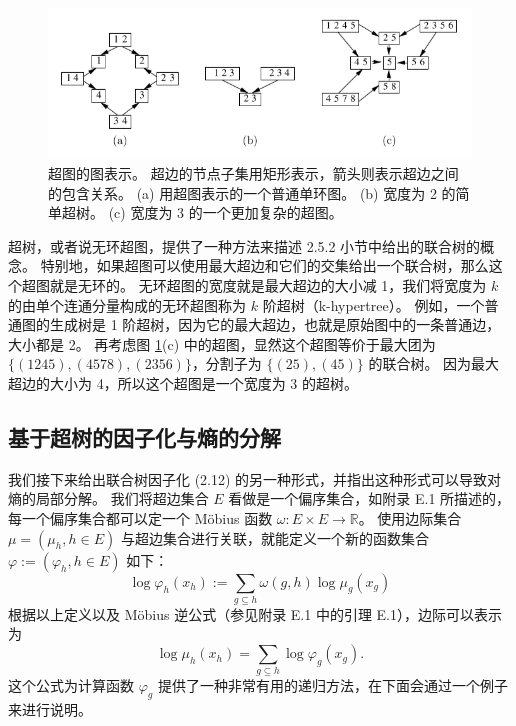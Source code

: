 \begin{figure}[htbp]
    \centering
    \includegraphics[width=.9\linewidth]{figure/4-4.PNG}
    \caption{
        超图的图表示。
        超边的节点子集用矩形表示，箭头则表示超边之间的包含关系。
        (a) 用超图表示的一个普通单环图。
        (b) 宽度为 2 的简单超树。
        (c) 宽度为 3 的一个更加复杂的超图。
    }\label{fig:4-4}
\end{figure}

超树，或者说无环超图，提供了一种方法来描述 2.5.2 小节中给出的联合树的概念。
特别地，如果超图可以使用最大超边和它们的交集给出一个联合树，那么这个超图就是无环的。
无环超图的宽度就是最大超边的大小减 1，我们将宽度为 $k$ 的由单个连通分量构成的无环超图称为 $k$ 阶超树（k-hypertree）。
例如，一个普通图的生成树是 1 阶超树，因为它的最大超边，也就是原始图中的一条普通边，大小都是 2。
再考虑图 \ref{fig:4-4}(c) 中的超图，显然这个超图等价于最大团为 $\{(1245), (4578), (2356)\}$，分割子为 $\{(25), (45)\}$ 的联合树。
因为最大超边的大小为 4，所以这个超图是一个宽度为 3 的超树。

\subsection{基于超树的因子化与熵的分解}

我们接下来给出联合树因子化 (2.12) 的另一种形式，并指出这种形式可以导致对熵的局部分解。
我们将超边集合 $E$ 看做是一个偏序集合，如附录 E.1 所描述的，每一个偏序集合都可以定一个 M\"obius 函数 $\omega: E \times E \rightarrow \mathbb{R}$。
使用边际集合 $\mu = (\mu_h, h \in E)$ 与超边集合进行关联，就能定义一个新的函数集合 $\varphi := (\varphi_h, h \in E)$ 如下：
\begin{equation}
    \log\varphi_h(x_h) := \sum_{g \subseteq h}\omega(g, h)\log\mu_g(x_g)
\end{equation}
根据以上定义以及 M\"obius 逆公式（参见附录 E.1 中的引理 E.1），边际可以表示为
\begin{equation}
    \log\mu_h(x_h) = \sum_{g \subseteq h}\log\varphi_g(x_g).
\end{equation}
这个公式为计算函数 $\varphi_g$ 提供了一种非常有用的递归方法，在下面会通过一个例子来进行说明。

